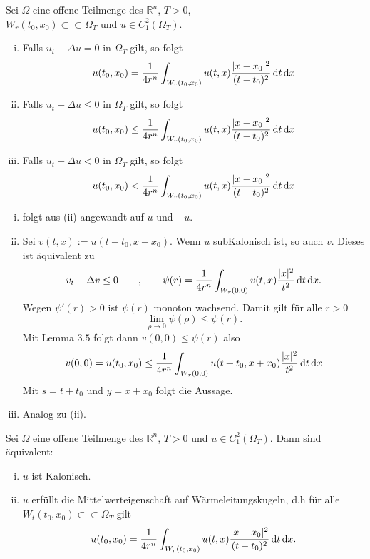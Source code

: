 
\begin{satz}[Mittelwerteigenschaft]
	Sei $\Omega$ eine offene Teilmenge des $\mathbb{R}^n$, $T >0$, \\ $W_r(t_0,x_0) \subset \subset \Omega_T$ und $u \in C^2_1(\Omega_T)$.
	\begin{enumerate}[(i)]
		\item Falls $u_t - \Delta u = 0$ in $\Omega_T$ gilt, so folgt 
		\[
			u(t_0,x_0) = \frac{1}{4r^n} \int_{W_r(t_0,x_0)}^{} u(t,x) \frac{\lvert x-x_0\rvert^2}{(t-t_0)^2} \,\mathrm{d}t \,\mathrm{d}x
		\]
		\item Falls $u_t - \Delta u \leq 0$ in $\Omega_T$ gilt, so folgt \[
			u(t_0,x_0) \leq \frac{1}{4r^n} \int_{W_r(t_0,x_0)}^{} u(t,x) \frac{\lvert x-x_0\rvert^2}{(t-t_0)^2} \,\mathrm{d}t \,\mathrm{d}x
		\] 
		\item Falls $u_t - \Delta u < 0$ in $\Omega_T$ gilt, so folgt 
		\[
			u(t_0,x_0) < \frac{1}{4r^n} \int_{W_r(t_0,x_0)}^{} u(t,x) \frac{\lvert x-x_0\rvert^2}{(t-t_0)^2} \,\mathrm{d}t \,\mathrm{d}x
		\]
	\end{enumerate}
\end{satz}
\begin{beweis}
	\begin{enumerate}[(i)]
		\item folgt aus (ii) angewandt auf $u$ und $-u$.
		\item Sei $v(t,x) := u(t+ t_0 , x +x_0)$. Wenn $u$ subKalonisch ist, so auch $v$. Dieses ist äquivalent zu 
		\[
			v_t - \Delta v \leq 0 \qquad , \qquad \psi(r) = \frac{1}{4r^n} \int_{W_r(0,0)}^{} v(t,x) \frac{\lvert x\rvert^2}{t^2} \,\mathrm{d}t \,\mathrm{d}x. 
		\]
		Wegen $\psi'(r)>0$ ist $\psi(r)$ monoton wachsend. Damit gilt für alle $r >0$
		\[
			\lim_{\rho \to 0} \psi(\rho) \leq \psi(r).
		\]
		Mit Lemma $3.5$ folgt dann $v(0,0) \leq \psi(r)$ also
		\[
			v(0,0) = u(t_0,x_0) \leq \frac{1}{4r^n} \int_{W_r(0,0)}^{} u(t+t_0,x+ x_0) \frac{\lvert x\rvert^2}{t^2} \,\mathrm{d}t \,\mathrm{d}x
		\]
		Mit $s = t+t_0$ und $y = x + x_0$ folgt die Aussage.
		\item Analog zu (ii).
	\end{enumerate}
\end{beweis}

\begin{korollar}
	Sei $\Omega$ eine offene Teilmenge des $\mathbb{R}^n$, $T>0$ und $u \in C^2_1(\Omega_T)$. Dann sind äquivalent:
	\begin{enumerate}[(i)]
		\item $u$ ist Kalonisch.
		\item $u$ erfüllt die Mittelwerteigenschaft auf Wärmeleitungskugeln, d.h für alle \\ $W_t(t_0,x_0) \subset \subset \Omega_T$ gilt
		\[
			u(t_0,x_0) = \frac{1}{4r^n} \int_{W_r(t_0,x_0)}^{} u(t,x) \frac{\lvert x-x_0\rvert^2}{(t-t_0)^2} \,\mathrm{d}t \,\mathrm{d}x.
		\]
	\end{enumerate}
\end{korollar}

